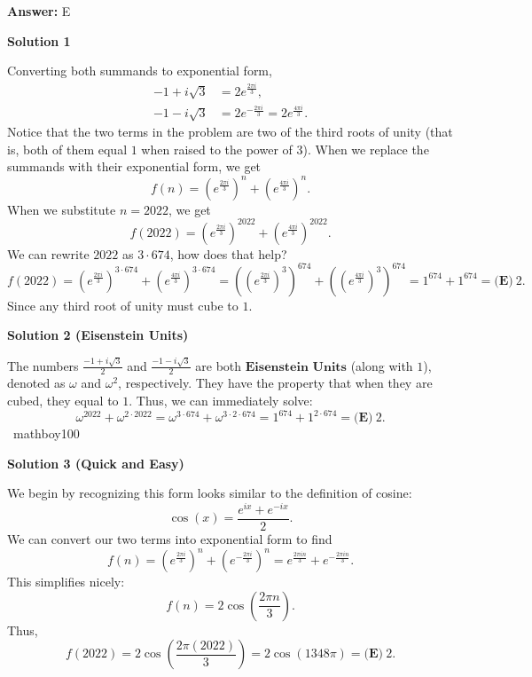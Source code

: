 \begin{enumerate}
 \textbf{Answer: }E



\textbf{Solution 1}

Converting both summands to exponential form, 
 \begin{align*} -1 + i\sqrt{3} &= 2e^{\frac{2\pi i}{3}}, \\ -1 - i\sqrt{3} &= 2e^{-\frac{2\pi i}{3}} = 2e^{\frac{4\pi i}{3}}. \end{align*}
Notice that the two terms in the problem are two of the third roots of unity (that is, both of them equal $1$ when raised to the power of $3$). When we replace the summands with their exponential form, we get 
 \[f(n) = \left(e^{\frac{2\pi i}{3}}\right)^n + \left(e^{\frac{4\pi i}{3}}\right)^n.\]When we substitute $n = 2022$, we get 
 \[f(2022) = \left(e^{\frac{2\pi i}{3}}\right)^{2022} + \left(e^{\frac{4\pi i}{3}}\right)^{2022}.\]We can rewrite $2022$ as $3 \cdot 674$, how does that help?
 \[f(2022) = \left(e^{\frac{2\pi i}{3}}\right)^{3 \cdot 674} + \left(e^{\frac{4\pi i}{3}}\right)^{3 \cdot 674} = \left(\left(e^{\frac{2\pi i}{3}}\right)^{3}\right)^{674} + \left(\left(e^{\frac{4\pi i}{3}}\right)^{3}\right)^{674} = 1^{674} + 1^{674} = \boxed{\textbf{(E)} \ 2}.\]Since any third root of unity must cube to $1$.

 



\textbf{Solution 2 (Eisenstein Units)}

The numbers $\frac{-1+i\sqrt{3}}{2}$ and $\frac{-1-i\sqrt{3}}{2}$ are both $\textbf{Eisenstein Units}$ (along with $1$), denoted as $\omega$ and $\omega^2$, respectively. They have the property that when they are cubed, they equal to $1$. Thus, we can immediately solve:
 \[\omega^{2022} + \omega^{2 \cdot 2022} = \omega^{3 \cdot 674} + \omega^{3 \cdot 2 \cdot 674} = 1^{674} + 1^{2 \cdot 674} = \boxed{\textbf{(E)} \ 2}.\]~mathboy100

 



\textbf{Solution 3 (Quick and Easy)}

We begin by recognizing this form looks similar to the definition of cosine: 
 \[\cos(x)=\frac{e^{ix}+e^{-ix}}{2}.\] We can convert our two terms into exponential form to find 
 \[f(n) = \left( e^{\frac{2\pi i}{3}} \right ) ^n + \left ( e^{-\frac{2\pi i}{3}} \right ) ^n=e^{\frac{2 \pi i n}{3}} + e^{-\frac{2\pi i n}{3}}.\] This simplifies nicely: 
 \[f(n)=2\cos\left( \frac{2\pi n}{3} \right).\] Thus, 
 \[f(2022)=2\cos \left ( \frac{2\pi (2022) }{3} \right) = 2\cos(1348 \pi) = \boxed{\textbf{(E)}\ 2}.\]





\end{enumerate}
